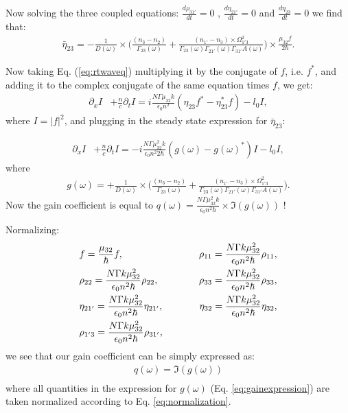 \documentclass[10pt,english,fleqn]{article}%
\begin{document}
Now solving the three coupled equations:  $\frac{d \rho_{31'}}{d t} = 0 $ , $\frac{d \eta_{21'}}{d t} = 0$ and $\frac{d \eta_{23}}{d t} = 0$ we find that:
\begin{align}
 \bar{\eta}_{23} = -\frac{1}{D(\omega)} \times \Bigg( \frac{ (n_3-n_2)}{\Gamma_{23}(\omega)} + \frac{(n_{1'} - n_3)\times \Omega_{1'3}^2 } 
 {\Gamma_{23}(\omega)\Gamma_{21'}(\omega)\Gamma_{31'} A(\omega) } \Bigg) \times \frac{\mu_{32} f}{2\hbar} .
\end{align}

Now taking Eq. (\ref{eq:rtwaveq}) multiplying it by the conjugate of $f$, i.e. $f^*$,  and adding it to the complex conjugate of the same 
equation times $f$, we get:
\begin{align}
 \partial_{x} I &+\frac{n}{c}\partial_t I = i\frac{N \Gamma \mu_{32} k}{\epsilon_0 n^2} (\eta_{23}f^* - \eta_{23}^* f) - l_0 I \label{eq:rtintensity}, 
\end{align}
where $I = |f|^2$, and plugging in the steady state expression for $\bar{\eta}_{23}$:

\begin{align}
 \partial_{x} I &+\frac{n}{c}\partial_t I = -i\frac{N \Gamma \mu_{32}^2 k}{\epsilon_0 n^2 2 \hbar  } (g(\omega) - g(\omega)^*)I - l_0 I \label{eq:rtintensity}, 
\end{align}
where 
\begin{align}
g(\omega) =  +\frac{1}{D(\omega)} \times \Bigg( \frac{ (n_3-n_2)}{\Gamma_{23}(\omega)} + \frac{(n_{1'} - n_3)\times \Omega_{1'3}^2 } 
 {\Gamma_{23}(\omega)\Gamma_{21'}(\omega)\Gamma_{31'} A(\omega) } \Bigg). \label{eq:gainexpression}
\end{align}
 Now the gain coefficient is equal to  
 $ q(\omega) =   \frac{N \Gamma \mu_{32}^2 k}{\epsilon_0 n^2  \hbar  } \times \Im{(g(\omega))} $ !
 
 Normalizing:
  \begin{align}
  & f = \frac{\mu_{32}}{\hbar} f, \hspace{10mm}
  &\rho_{11} = \frac{N \Gamma k \mu_{32}^2}{\epsilon_0 n^2 \hbar} \rho_{11}, \nonumber \\
 &\rho_{22} = \frac{N \Gamma k \mu_{32}^2}{\epsilon_0 n^2 \hbar} \rho_{22}, \hspace{10mm}
 &\rho_{33} = \frac{N \Gamma k \mu_{32}^2}{\epsilon_0 n^2 \hbar} \rho_{33}, \nonumber \\
  &\eta_{21'} = \frac{N \Gamma k \mu_{32}^2}{\epsilon_0 n^2 \hbar} \eta_{21'}, \hspace{10mm} 
  &\eta_{32} = \frac{N \Gamma k \mu_{32}^2}{\epsilon_0 n^2 \hbar} \eta_{32}, \nonumber \\  
 &\rho_{1'3} = \frac{N \Gamma k \mu_{32}^2}{\epsilon_0 n^2 \hbar} \rho_{31'}, \label{eq:normalization}
 \end{align}
 we see that our gain coefficient can be simply expressed as:
 \begin{align}
   q(\omega) = \Im{(g(\omega))}\\ 
 \end{align}
where all quantities in the expression for $g(\omega)$ (Eq.  \ref{eq:gainexpression}) are taken normalized according to Eq. \ref{eq:normalization}.
\end{document}
